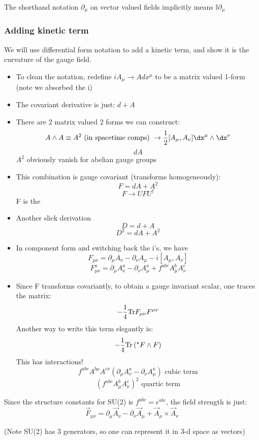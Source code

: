 \documentclass[11pt]{scrartcl}
\begin{document}
\begin{example}
	The shorthand notation $\partial_\mu$ on vector valued fields implicitly means
	$\mathbf{\mathbb{I}} \partial_\mu$
\end{example}

\subsubsection{Adding kinetic term}
We will use differential form notation to add a kinetic term, and show it is the curvature of the gauge field.

\begin{itemize}
	\item To clean the notation, redefine $i A_\mu \rightarrow A dx^{\mu}$ to be a matrix valued 1-form (note we absorbed the i)
	\item The covariant derivative is just:
	$d + A$
	\item There are 2 matrix valued 2 forms we can construct:
	\[A \wedge A \equiv A^2 \text{ (in spacetime comps) } \rightarrow \frac12 [A_\mu, A_\nu] \dx^\mu \wedge \dx^\nu \]
	\[ dA \]
	$A^2$ obviously vanish for abelian gauge groups
	\item This combination is gauge covariant (transforms homogeneously):
	\[ F = dA + A^2 \]
	\[F \rightarrow U F U^\dagger \]
	F is the 
	\item Another slick derivation
	\[ D = d + A \]
	\[D^2 = dA + A^2 \]
	\item In component form and switching back the i's, we have
	\[F_{\mu \nu} = \partial_\mu A_\nu - \partial_\nu A_\mu - i[A_\mu, A_\nu] \]
	\[F^{a}_{\mu \nu}  = \partial_\mu A^a_\nu - \partial_\nu A^a_\mu + f^{abc} A^{b}_\mu A^c_\nu \]
	\item Since F transforms covariantly, to obtain a gauge invariant scalar, one traces the matrix:
	\[ - {1 \over 4} \mathrm{Tr} F_{\mu \nu} F^{\mu \nu} \]
	Another way to write this term elegantly is:
	\[ -{1 \over 4} \mathrm{Tr} \left( ^\star F \wedge F \right) \]
	This has interactions!
	\[f^{abc} A^{b \mu} A^{c \nu} (\partial_\mu A^a_\nu - \partial_\nu A^a_\mu)  \text{ cubic term} \]
	\[(f^{abc} A^b_\mu A^c_\nu)^2 \text{ quartic term}\]
	\end{itemize}

\begin{example}
	Since the structure constants for SU(2) is 
	$f^{abc} = \epsilon^{abc}$, the field strength is just:
	\[ \vec{F}_{\mu \nu} = \partial_\mu \vec{A}_{\nu} - \partial_\nu \vec{A}_{\mu} + \vec{A}_\mu \times \vec{A}_\nu \]

	(Note SU(2) has 3 generators, so one can represent it in 3-d space as vectors)
	\end{example}
\end{document}
